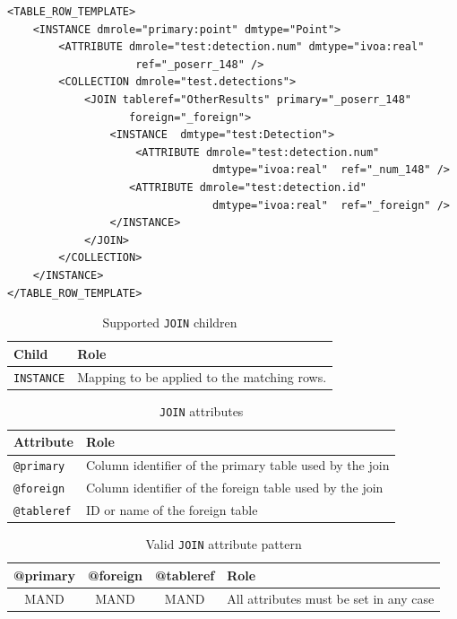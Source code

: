 \documentclass[11pt,a4paper]{ivoa}
\begin{document}
\begin{lstlisting}[caption={JOIN example},style=XML]
<TABLE_ROW_TEMPLATE>
    <INSTANCE dmrole="primary:point" dmtype="Point">
        <ATTRIBUTE dmrole="test:detection.num" dmtype="ivoa:real"
                    ref="_poserr_148" />
        <COLLECTION dmrole="test.detections">
            <JOIN tableref="OtherResults" primary="_poserr_148"
                   foreign="_foreign">
                <INSTANCE  dmtype="test:Detection">
                    <ATTRIBUTE dmrole="test:detection.num" 
                                dmtype="ivoa:real"  ref="_num_148" />
                   <ATTRIBUTE dmrole="test:detection.id" 
                                dmtype="ivoa:real"  ref="_foreign" />
                </INSTANCE>
            </JOIN>
        </COLLECTION>
    </INSTANCE>
</TABLE_ROW_TEMPLATE>
\end{lstlisting}


\begin{table}[hbtp]
\small
\centering
\begin{tabulary}{\linewidth}{|L|J|}
\hline
    \textbf{Child} &
    \textbf{Role} \\
\hline \hline
     \texttt{INSTANCE}    &
     Mapping to be applied to the matching rows.  \\       
\hline
\end{tabulary}
     \caption{Supported  \texttt{JOIN} children} 
     \label{tbl:join-children}
\end{table}

\begin{table}[!htbp]
\small
\centering
\begin{tabulary}{\linewidth}{|L|J|}
       \hline
           \textbf{Attribute} &  
           \textbf{Role} \\
       \hline  \hline
           \texttt{@primary}    & 
           Column identifier of the primary table used  by the join \\       
       \hline  
           \texttt{@foreign}    & 
           Column identifier of the foreign table used  by the join \\       
      \hline  
           \texttt{@tableref}    & 
           ID or name of the foreign table \\       
       \hline 
\end{tabulary}
\caption{\texttt{JOIN} attributes} 
\label{tbl:join-att}
\end{table}

\begin{table}[!htbp]
\small
\centering
\begin{tabulary}{\linewidth}{|C|C|C|J|}
       \hline \hline
           \textbf{@primary} &  
           \textbf{@foreign} &                     
           \textbf{@tableref} &          
           \textbf{Role} \\
       \hline  
           MAND    &            
           MAND    &            
           MAND    & 
           All attributes must be set in any case \\       
       \hline 
\end{tabulary}
\caption{Valid \texttt{JOIN} attribute pattern} 
\label{tbl:join-patterns}
\end{table}
\end{document}
